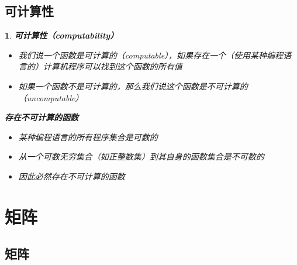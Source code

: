 \documentclass[UTF8]{report}
\theoremstyle{MyLineTheoremStyle} %
\theoremstyle{MyBlockTheoremStyle} %
\theoremstyle{MySubsubsectionStyle} %
\newtheorem{definition}{}
\begin{document}
\subsection{可计算性}

\begin{definition}
    \textbf{可计算性（computability）}\par
    \begin{itemize}
        \item 我们说一个函数是可计算的（computable），如果存在一个（使用某种编程语言的）计算机程序可以找到这个函数的所有值
        \item 如果一个函数不是可计算的，那么我们说这个函数是不可计算的（uncomputable）
    \end{itemize}

    \textbf{存在不可计算的函数}\par
    \begin{itemize}
        \item 某种编程语言的所有程序集合是可数的
        \item 从一个可数无穷集合（如正整数集）到其自身的函数集合是不可数的
        \item 因此必然存在不可计算的函数
    \end{itemize}
\end{definition}

\section{矩阵}

\subsection{矩阵}
\end{document}
